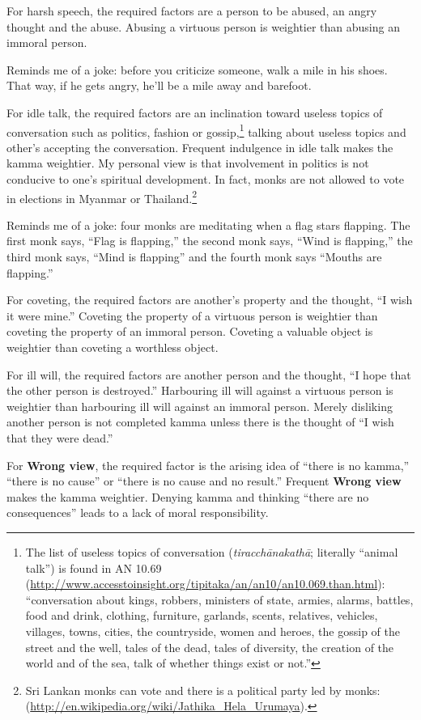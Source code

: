 For harsh speech, the required factors are a person to be abused, an angry thought and the abuse. Abusing a virtuous person is weightier than abusing an immoral person. 

Reminds me of a joke: before you criticize someone, walk a mile in his shoes. That way, if he gets angry, he’ll be a mile away and barefoot.

For idle talk, the required factors are an inclination toward useless topics of conversation such as politics, fashion or gossip,\footnote{The list of useless topics of conversation (\textit{tiracchānakathā}; literally “animal talk”) is found in AN 10.69 (\url{http://www.accesstoinsight.org/tipitaka/an/an10/an10.069.than.html}): “conversation about kings, robbers, ministers of state, armies, alarms, battles, food and drink, clothing, furniture, garlands, scents, relatives, vehicles, villages, towns, cities, the countryside, women and heroes, the gossip of the street and the well, tales of the dead, tales of diversity, the creation of the world and of the sea, talk of whether things exist or not.”} talking about useless topics and other’s accepting the conversation. Frequent indulgence in idle talk makes the kamma weightier. My personal view is that involvement in politics is not conducive to one’s spiritual development. In fact, monks are not allowed to vote in elections in Myanmar or Thailand.\footnote{Sri Lankan monks can vote and there is a political party led by monks: (\url{http://en.wikipedia.org/wiki/Jathika_Hela_Urumaya}).} 

Reminds me of a joke: four monks are meditating when a flag stars flapping. The first monk says, “Flag is flapping,” the second monk says, “Wind is flapping,” the third monk says, “Mind is flapping” and the fourth monk says “Mouths are flapping.”

For coveting, the required factors are another’s property and the thought, “I wish it were mine.” Coveting the property of a virtuous person is weightier than coveting the property of an immoral person. Coveting a valuable object is weightier than coveting a worthless object.

For ill will, the required factors are another person and the thought, “I hope that the other person is destroyed.” Harbouring ill will against a virtuous person is weightier than harbouring ill will against an immoral person. Merely disliking another person is not completed kamma unless there is the thought of “I wish that they were dead.”

For \textbf{Wrong view}, the required factor is the arising idea of “there is no kamma,” “there is no cause” or “there is no cause and no result.” Frequent \textbf{Wrong view} makes the kamma weightier. Denying kamma and thinking “there are no consequences” leads to a lack of moral responsibility.

